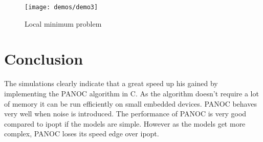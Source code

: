 \begin{figure}[H]
	\centering
	\texttt{[image: demos/demo3]}
	\caption{Local minimum problem}
	\label{fig:demo: local minimum problem}
\end{figure}

\section{Conclusion}

The simulations clearly indicate that a great speed up his gained by implementing the PANOC algorithm in C. As the algorithm doesn't require a lot of memory it can be run efficiently on small embedded devices. PANOC behaves very well when noise is introduced. The performance of PANOC is very good compared to ipopt if the models are simple. However as the models get more complex, PANOC loses its speed edge over ipopt.